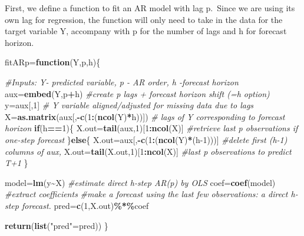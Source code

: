 \documentclass[
]{article}
\newenvironment{Shaded}{\begin{snugshade}}{\end{snugshade}}
\newcommand{\CommentTok}[1]{\textcolor[rgb]{0.56,0.35,0.01}{\textit{#1}}}
\newcommand{\ControlFlowTok}[1]{\textcolor[rgb]{0.13,0.29,0.53}{\textbf{#1}}}
\newcommand{\DecValTok}[1]{\textcolor[rgb]{0.00,0.00,0.81}{#1}}
\newcommand{\FunctionTok}[1]{\textcolor[rgb]{0.13,0.29,0.53}{\textbf{#1}}}
\newcommand{\NormalTok}[1]{#1}
\newcommand{\OtherTok}[1]{\textcolor[rgb]{0.56,0.35,0.01}{#1}}
\newcommand{\SpecialCharTok}[1]{\textcolor[rgb]{0.81,0.36,0.00}{\textbf{#1}}}
\newcommand{\StringTok}[1]{\textcolor[rgb]{0.31,0.60,0.02}{#1}}
\begin{document}
First, we define a function to fit an AR model with lag p.~Since we are
using its own lag for regression, the function will only need to take in
the data for the target variable Y, accompany with p for the number of
lags and h for forecast horizon.

\begin{Shaded}
\begin{Highlighting}[]
\NormalTok{fitARp}\OtherTok{=}\ControlFlowTok{function}\NormalTok{(Y,p,h)\{}
    
    \CommentTok{\#Inputs: Y{-} predicted variable,  p {-} AR order, h {-}forecast horizon}
\NormalTok{    aux}\OtherTok{=}\FunctionTok{embed}\NormalTok{(Y,p}\SpecialCharTok{+}\NormalTok{h) }\CommentTok{\#create p lags + forecast horizon shift (=h option)}
\NormalTok{    y}\OtherTok{=}\NormalTok{aux[,}\DecValTok{1}\NormalTok{] }\CommentTok{\#  Y variable aligned/adjusted for missing data due to lags}
\NormalTok{    X}\OtherTok{=}\FunctionTok{as.matrix}\NormalTok{(aux[,}\SpecialCharTok{{-}}\FunctionTok{c}\NormalTok{(}\DecValTok{1}\SpecialCharTok{:}\NormalTok{(}\FunctionTok{ncol}\NormalTok{(Y)}\SpecialCharTok{*}\NormalTok{h))]) }\CommentTok{\# lags of Y corresponding to forecast horizon }
    \ControlFlowTok{if}\NormalTok{(h}\SpecialCharTok{==}\DecValTok{1}\NormalTok{)\{ }
\NormalTok{      X.out}\OtherTok{=}\FunctionTok{tail}\NormalTok{(aux,}\DecValTok{1}\NormalTok{)[}\DecValTok{1}\SpecialCharTok{:}\FunctionTok{ncol}\NormalTok{(X)] }\CommentTok{\#retrieve last p observations if one{-}step forecast }
\NormalTok{    \}}\ControlFlowTok{else}\NormalTok{\{}
\NormalTok{      X.out}\OtherTok{=}\NormalTok{aux[,}\SpecialCharTok{{-}}\FunctionTok{c}\NormalTok{(}\DecValTok{1}\SpecialCharTok{:}\NormalTok{(}\FunctionTok{ncol}\NormalTok{(Y)}\SpecialCharTok{*}\NormalTok{(h}\DecValTok{{-}1}\NormalTok{)))] }\CommentTok{\#delete first (h{-}1) columns of aux,  }
\NormalTok{      X.out}\OtherTok{=}\FunctionTok{tail}\NormalTok{(X.out,}\DecValTok{1}\NormalTok{)[}\DecValTok{1}\SpecialCharTok{:}\FunctionTok{ncol}\NormalTok{(X)] }\CommentTok{\#last p observations to predict T+1 }
\NormalTok{    \}}
    
\NormalTok{    model}\OtherTok{=}\FunctionTok{lm}\NormalTok{(y}\SpecialCharTok{\textasciitilde{}}\NormalTok{X) }\CommentTok{\#estimate direct h{-}step AR(p) by OLS }
\NormalTok{    coef}\OtherTok{=}\FunctionTok{coef}\NormalTok{(model) }\CommentTok{\#extract coefficients}
    \CommentTok{\#make a forecast using the last few observations: a direct h{-}step forecast.}
\NormalTok{    pred}\OtherTok{=}\FunctionTok{c}\NormalTok{(}\DecValTok{1}\NormalTok{,X.out)}\SpecialCharTok{\%*\%}\NormalTok{coef }
    
    \FunctionTok{return}\NormalTok{(}\FunctionTok{list}\NormalTok{(}\StringTok{"pred"}\OtherTok{=}\NormalTok{pred)) }
\NormalTok{  \}}
\end{Highlighting}
\end{Shaded}
\end{document}
